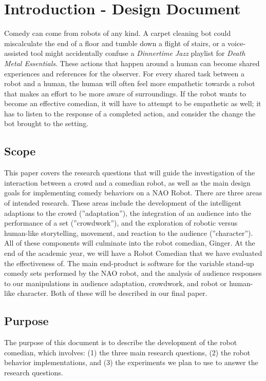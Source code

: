 
\section{Introduction - Design Document}

  Comedy can come from robots of any kind. A carpet cleaning bot could miscalculate the end of a floor and tumble down a flight of stairs, or a voice-assisted tool might accidentally confuse a \textit{Dinnertime Jazz} playlist for \textit{Death Metal Essentials}. These actions that happen around a human can become shared experiences and references for the observer. For every shared task between a robot and a human, the human will often feel more empathetic towards a robot that makes an effort to be more aware of surroundings\cite{DesignExBeh:2017}. If the robot wants to become an effective comedian, it will have to attempt to be empathetic as well; it has to listen to the response of a completed action, and consider the change the bot brought to the setting.

\subsection{Scope}
This paper covers the research questions that will guide the investigation of the interaction between a crowd and
a comedian robot, as well as the main design goals for implementing comedy behaviors on a NAO Robot. There
are three areas of intended research. These areas include the development of the intelligent adaptions to the crowd
(”adaptation”), the integration of an audience into the performance of a set (”crowdwork”), and the exploration of
robotic versus human-like storytelling, movement, and reaction to the audience (”character”). All of these components
will culminate into the robot comedian, Ginger. At the end of the academic year, we will have a Robot Comedian that we
have evaluated the effectiveness of. The main end-product is software for the variable stand-up comedy sets performed
by the NAO robot, and the analysis of audience responses to our manipulations in audience adaptation, crowdwork,
and robot or human-like character. Both of these will be described in our final paper.


  \subsection{Purpose}
	The purpose of this document is to describe the development of the robot comedian, which involves: (1) the three
main research questions, (2) the robot behavior implementations, and (3) the experiments we plan to use to answer the
research questions.


